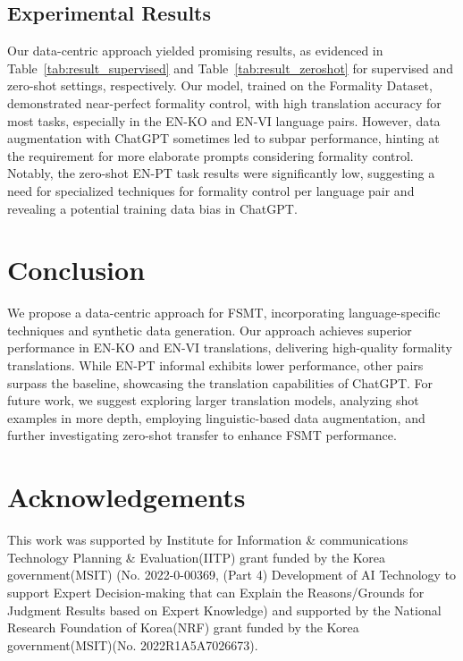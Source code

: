 \documentclass{article}
\theoremstyle{plain}
\theoremstyle{definition}
\theoremstyle{remark}
\begin{document}
\subsection{Experimental Results}
Our data-centric approach yielded promising results, as evidenced in Table~\ref{tab:result_supervised} and Table~\ref{tab:result_zeroshot} for supervised and zero-shot settings, respectively. Our model, trained on the Formality Dataset, demonstrated near-perfect formality control, with high translation accuracy for most tasks, especially in the EN-KO and EN-VI language pairs. However, data augmentation with ChatGPT sometimes led to subpar performance, hinting at the requirement for more elaborate prompts considering formality control. Notably, the zero-shot EN-PT task results were significantly low, suggesting a need for specialized techniques for formality control per language pair and revealing a potential training data bias in ChatGPT.



\section{Conclusion}
We propose a data-centric approach for FSMT, incorporating language-specific techniques and synthetic data generation. Our approach achieves superior performance in EN-KO and EN-VI translations, delivering high-quality formality translations. While EN-PT informal exhibits lower performance, other pairs surpass the baseline, showcasing the translation capabilities of ChatGPT. For future work, we suggest exploring larger translation models, analyzing shot examples in more depth, employing linguistic-based data augmentation, and further investigating zero-shot transfer to enhance FSMT performance.

\section*{Acknowledgements}
This work was supported by Institute for Information \& communications Technology Planning \& Evaluation(IITP) grant funded by the Korea government(MSIT) (No. 2022-0-00369, (Part 4) Development of AI Technology to support Expert Decision-making that can Explain the Reasons/Grounds for Judgment Results based on Expert Knowledge) and supported by the National Research Foundation of Korea(NRF) grant funded by the Korea government(MSIT)(No. 2022R1A5A7026673).
\end{document}
